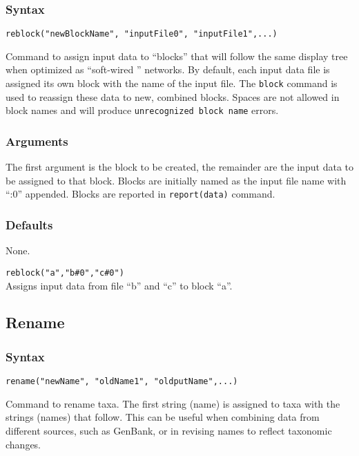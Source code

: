 	\subsubsection{Syntax}
		\texttt{reblock("newBlockName", "inputFile0", "inputFile1",...)}
	
	\begin{phygdescription}
	{Command to assign input data to ``blocks'' that will follow the same display tree when optimized
	as ``soft-wired '' networks. By default, each input data file is assigned its own block with the name
	of the input file. The \texttt{block} command is used to reassign these data to new, combined blocks.
	Spaces are not allowed in block names and will produce \texttt{unrecognized block name} errors.}  
	\end{phygdescription}
	
	\subsubsection{Arguments}
		The first argument is the block to be created, the remainder are the input data to be 
		assigned to that block. Blocks are initially named as the input file name with ``:0'' appended. 
		Blocks are reported in \texttt{report(data)} command.
	
	\subsubsection{Defaults}
		None.
	
	\begin{example}

		\item{\texttt{reblock("a","b\#0","c\#0")}\\ Assigns input data from file ``b'' and ``c'' to block ``a''. }
	
	\end{example}

\subsection{Rename}
	\subsubsection{Syntax}
		\texttt{rename("newName", "oldName1", "oldputName",...)}
		
	\begin{phygdescription}
	{Command to rename taxa. The first string (name) is assigned to taxa with the strings (names) 
	that follow. This can be useful when combining data from different sources, such as GenBank, 
	or in revising names to reflect taxonomic changes.}
	\end{phygdescription}
	
